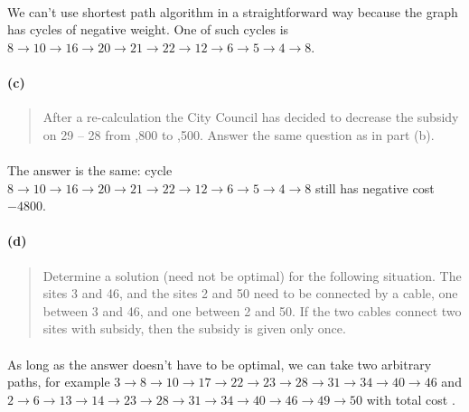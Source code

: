 \paragraph{}
We can't use shortest path algorithm in a straightforward way because the graph has cycles of negative weight. One of such cycles is $8 \rightarrow 10 \rightarrow 16 \rightarrow 20 \rightarrow 21 \rightarrow 22 \rightarrow 12 \rightarrow 6 \rightarrow 5 \rightarrow 4 \rightarrow 8$.

\paragraph{(c)}
\begin{quote}
After a re-calculation the City Council has decided to decrease the subsidy on 29 – 28 from ,800 to ,500. Answer the same question as in part (b).
\end{quote}

\paragraph{}
The answer is the same: cycle $8 \rightarrow 10 \rightarrow 16 \rightarrow 20 \rightarrow 21 \rightarrow 22 \rightarrow 12 \rightarrow 6 \rightarrow 5 \rightarrow 4 \rightarrow 8$ still has negative cost \texteuro $-4800$.

\paragraph{(d)}
\begin{quote}
Determine a solution (need not be optimal) for the following situation. The sites 3 and 46, and the sites 2 and 50 need to be connected by a cable, one between 3 and 46, and one between 2 and 50. If the two cables connect two sites with subsidy, then the subsidy is given only once.
\end{quote}

\paragraph{}
As long as the answer doesn't have to be optimal, we can take two arbitrary paths, for example $3 \rightarrow 8 \rightarrow 10 \rightarrow 17 \rightarrow 22 \rightarrow 23 \rightarrow 28 \rightarrow 31 \rightarrow 34 \rightarrow 40 \rightarrow 46$ and $ 2 \rightarrow 6 \rightarrow 13 \rightarrow 14 \rightarrow 23 \rightarrow 28 \rightarrow 31 \rightarrow 34 \rightarrow 40 \rightarrow 46 \rightarrow 49 \rightarrow 50 $ with total cost .
